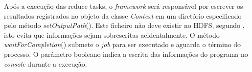 Após a execução das reduce tasks, o \textit{framework} será responsável por escrever os resultados registrados no objeto da classe \textit{Context} em um diretório  especificado pelo método \textit{setOutputPath}(). Este ficheiro não deve existir no HDFS, segundo , isto evita que informações sejam sobrescritas acidentalmente. O método \textit{waitForCompletion}() submete o \textit{job} para ser executado e aguarda o término do processo. O parâmetro booleano indica a escrita das informações do programa no \textit{console} durante a execução.


